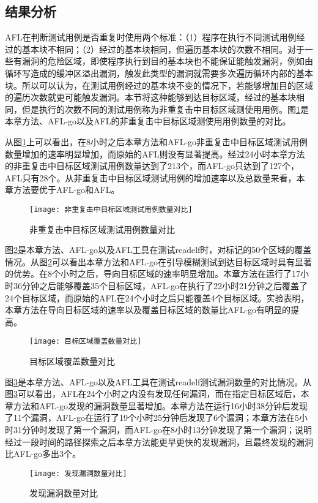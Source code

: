 \subsection{结果分析}

AFL在判断测试用例是否重复时使用两个标准：（1）程序在执行不同测试用例经过的基本块不相同；（2）经过的基本块相同，但遍历基本块的次数不相同。对于一些有漏洞的危险区域，即使程序执行到目的基本块也不能保证能触发漏洞，例如由循环写造成的缓冲区溢出漏洞，触发此类型的漏洞就需要多次遍历循环内部的基本块。所以可以认为，在测试用例经过的基本块不变的情况下，若能够增加目的区域的遍历次数就更可能触发漏洞。本节将这种能够到达目标区域，经过的基本块相同，但是执行的次数不同的测试用例称为非重复击中目标区域测使用用例。图\ref{非重复击中目标区域测试用例数量对比}是本章方法、AFL-go以及AFL的非重复击中目标区域测使用用例数量的对比。

从图\ref{非重复击中目标区域测试用例数量对比}上可以看出，在8小时之后本章方法和AFL-go非重复击中目标区域测试用例数量增加的速率明显增加，而原始的AFL则没有显著提高。经过24小时本章方法的非重复击中目标区域测试用例数量达到了213个，而AFL-go只达到了127个，AFL只有28个。从非重复击中目标区域测试用例的增加速率以及总数量来看，本章方法要优于AFL-go和AFL。

\begin{figure}[htb]
\begin{center}
\texttt{[image: 非重复击中目标区域测试用例数量对比]}
\end{center}
\caption{非重复击中目标区域测试用例数量对比}
\label{非重复击中目标区域测试用例数量对比}
\end{figure}

图\ref{目标区域覆盖数量对比}是本章方法、AFL-go以及AFL工具在测试readelf时，对标记的50个区域的覆盖情况。从图\ref{目标区域覆盖数量对比}可以看出本章方法和AFL-go在引导模糊测试到达目标区域时具有显著的优势。在8个小时之后，导向目标区域的速率明显增加。本章方法在运行了17小时36分钟之后能够覆盖35个目标区域，AFL-go在执行了22小时21分钟之后覆盖了24个目标区域，而原始的AFL在24个小时之后只能覆盖4个目标区域。实验表明，本章方法在导向目标区域的速率以及覆盖目标区域的数量比AFL-go有明显的提高。

\begin{figure}[htb]
\begin{center}
\texttt{[image: 目标区域覆盖数量对比]}
\end{center}
\caption{目标区域覆盖数量对比}
\label{目标区域覆盖数量对比}
\end{figure}

图\ref{发现漏洞数量对比}是本章方法、AFL-go以及AFL工具在测试readelf测试漏洞数量的对比情况。从图\ref{发现漏洞数量对比}可以看出，AFL在24个小时之内没有发现任何漏洞，而在指定目标区域后，本章方法和AFL-go发现的漏洞数量显著增加。本章方法在运行16小时38分钟后发现了11个漏洞，AFL-go在运行了19个小时25分钟后发现了6个漏洞；本章方法在5小时31分钟时发现了第一个漏洞，而AFL-go在8小时13分钟发现了第一个漏洞；说明经过一段时间的路径探索之后本章方法能更早更快的发现漏洞，且最终发现的漏洞比AFL-go多出3个。
\begin{figure}[htb]
\begin{center}
\texttt{[image: 发现漏洞数量对比]}
\end{center}
\caption{发现漏洞数量对比}
\label{发现漏洞数量对比}
\end{figure}

